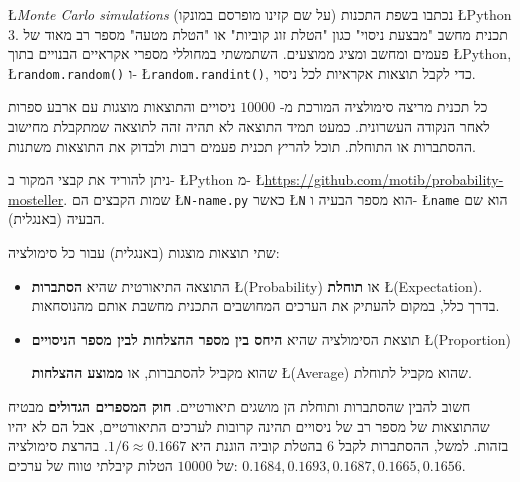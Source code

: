 \L{\emph{Monte Carlo simulations}}
(על שם קזינו מופרסם במונקו) נכתבו בשפת התכנות
\L{Python 3}.
תכנית מחשב "מבצעת ניסוי" כגון "הטלת זוג קוביות" או "הטלת מטעה" מספר רב מאוד של פעמים ומחשב ומציג ממוצעים. השתמשתי במחוללי מספרי אקראיים הבנויים בתוך
\L{Python},
\L{\texttt{random.random()}}
ו-%
\L{\texttt{random.randint()}},
כדי לקבל תוצאות אקראיות לכל ניסוי.

כל תכנית מריצה סימולציה המורכת מ-%
$10000$
ניסויים והתוצאות מוצגות עם ארבע ספרות לאחר הנקודה העשרונית. כמעט תמיד התוצאה לא תהיה זהה לתוצאה שמתקבלת מחישוב ההסתברות או התוחלת. תוכל להריץ תכנית פעמים רבות ולבדוק את התוצאות משתנות.

ניתן להוריד את קבצי המקור ב-%
\L{Python}
מ-%
\L{\url{https://github.com/motib/probability-mosteller}}.
שמות הקבצים הם 
\L{\texttt{N-name.py}}
כאשר
\L{\texttt{N}}
הוא מספר הבעיה ו-%
\L{\texttt{name}}
הוא שם הבעיה (באנגלית).

שתי תוצאות מוצגות (באנגלית) עבור כל סימולציה:
\begin{itemize}
\item
התוצאה התיאורטית שהיא 
\textbf{הסתברות}
\L{(Probability)}
או
\textbf{תוחלת}
\L{(Expectation)}.
בדרך כלל, במקום להעתיק את הערכים המחושבים התכנית מחשבת אותם מהנוסחאות.
\item
תוצאת הסימולציה שהיא
\textbf{היחס בין מספר ההצלחות לבין מספר הניסויים}
\L{(Proportion)}

שהוא מקביל להסתברות, או
\textbf{ממוצע ההצלחות}
\L{(Average)}
שהוא מקביל לתוחלת.
\end{itemize}
חשוב להבין שהסתברות ותוחלת הן מושגים תיאורטיים. 
\textbf{חוק המספרים הגדולים}
מבטיח שהתוצאות של מספר רב של ניסויים תהינה קרובות לערכים התיאורטיים, אבל הם לא יהיו בזהות. למשל, ההסתברות לקבל 
$6$
בהטלת קוביה הוגנת היא
$1/6\approx 0.1667$.
בהרצת סימולציה של 
$10000$
הטלות קיבלתי טווח של ערכים:
$0.1684, 0.1693, 0.1687, 0.1665, 0.1656$.

\newpage
